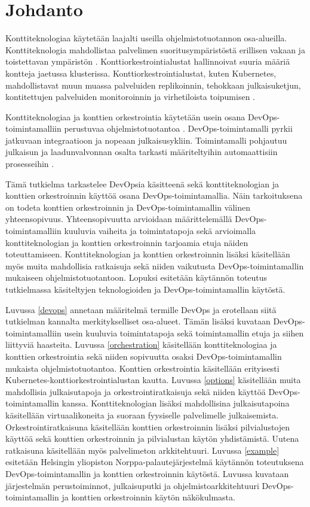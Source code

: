 \chapter{Johdanto\label{intro}}

Konttiteknologiaa käytetään laajalti useilla ohjelmistotuotannon osa-alueilla.
Konttiteknologia mahdollistaa palvelimen suoritusympäristöstä erillisen vakaan ja toistettavan ympäristön \cite{Watada19}.
Konttiorkestrointialustat hallinnoivat suuria määriä kontteja jaetussa klusterissa.
Konttiorkestrointialustat, kuten Kubernetes, mahdollistavat muun muassa palveluiden replikoinnin, tehokkaan julkaisuketjun, kontitettujen palveluiden monitoroinnin ja virhetiloista toipumisen \cite{Khan17}.

Konttiteknologiaa ja konttien orkestrointia käytetään usein osana DevOps-toimintamalliin perustuvaa ohjelmistotuotantoa \cite{Kang16, Narasimhulu23}.
DevOps-toimintamalli pyrkii jatkuvaan integraatioon ja nopeaan julkaisusykliin.
Toimintamalli pohjautuu julkaisun ja laadunvalvonnan osalta tarkasti määriteltyihin automaattisiin prosesseihin \cite{Jabbari16}.

Tämä tutkielma tarkastelee DevOpsia käsitteenä sekä konttiteknologian ja konttien orkestroinnin käyttöä osana DevOps-toimintamallia.
Näin tarkoituksena on todeta konttien orkestroinnin ja DevOps-toimintamallin välinen yhteensopivuus.
Yhteensopivuutta arvioidaan määrittelemällä DevOps-toimintamalliin kuuluvia vaiheita ja toimintatapoja sekä arvioimalla konttiteknologian ja konttien orkestroinnin tarjoamia etuja näiden toteuttamiseen.
Konttiteknologian ja konttien orkestroinnin lisäksi käsitellään myös muita mahdollisia ratkaisuja sekä niiden vaikutusta DevOps-toimintamallin mukaiseen ohjelmistotuotantoon.
Lopuksi esitetään käytännön toteutus tutkielmassa käsiteltyjen teknologioiden ja DevOps-toimintamallin käytöstä.

Luvussa \ref{devops} annetaan määritelmä termille DevOps ja erotellaan siitä tutkielman kannalta merkitykselliset osa-alueet.
Tämän lisäksi kuvataan DevOps-toimintamalliin usein kuuluvia toimintatapoja sekä toimintamallin etuja ja siihen liittyviä haasteita.
Luvussa \ref{orchestration} käsitellään konttiteknologiaa ja konttien orkestrointia sekä niiden sopivuutta osaksi DevOps-toimintamallin mukaista ohjelmistotuotantoa.
Konttien orkestrointia käsitellään erityisesti Kubernetes-konttiorkestrointialustan kautta.
Luvussa \ref{options} käsitellään muita mahdollisia julkaisutapoja ja orkestrointiratkaisuja sekä niiden käyttöä DevOps-toimintamallin kanssa.
Konttiteknologian lisäksi mahdollisina julkaisutapoina käsitellään virtuaalikoneita ja suoraan fyysiselle palvelimelle julkaisemista.
Orkestrointiratkaisuna käsitellään konttien orkestroinnin lisäksi pilvialustojen käyttöä sekä konttien orkestroinnin ja pilvialustan käytön yhdistämistä.
Uutena ratkaisuna käsitellään myös palvelimeton arkkitehtuuri.
Luvussa \ref{example} esitetään Helsingin yliopiston Norppa-palautejärjestelmä käytännön toteutuksena DevOps-toimintamallin ja konttien orkestroinnin käytöstä.
Luvussa kuvataan järjestelmän perustoiminnot, julkaisuputki ja ohjelmistoarkkitehtuuri DevOps-toimintamallin ja konttien orkestroinnin käytön näkökulmasta.
